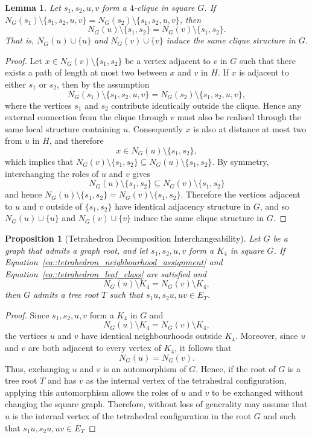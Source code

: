 \documentclass[11pt]{article}
\newtheorem{proposition}{Proposition}
\newtheorem{lemma}{Lemma}
\begin{document}
\begin{lemma} \label{lemma::tetrahedron_subset_neighbourhood}
  Let $s_1,s_2,u,v$ form a $4$-clique in square $G$. If $N_G(s_1)\setminus\{s_1,s_2,u,v\}=N_G(s_2)\setminus\{s_1,s_2,u,v\}$, then
  \[
  N_G(u)\setminus\{s_1, s_2\}=N_G(v)\setminus\{s_1, s_2\}.
  \]
  That is, $N_G(u)\cup\{u\}$ and $N_G(v)\cup\{v\}$ induce the same clique structure in $G$.
\end{lemma}
\begin{proof}
  Let $x \in N_G(v)\setminus\{s_1,s_2\}$ be a vertex adjacent to $v$ in $G$ such that there exists a path of length at most two between $x$ and $v$ in $H$. If $x$ is adjacent to either $s_1$ or $s_2$, then by the assumption
  \[
  N_G(s_1)\setminus\{s_1,s_2,u,v\}
  =
  N_G(s_2)\setminus\{s_1,s_2,u,v\},
  \]
  where the vertices $s_1$ and $s_2$ contribute identically outside the clique. Hence any external connection from the clique through $v$ must also be realised through the same local structure containing $u$. Consequently $x$ is also at distance at most two from $u$ in $H$, and therefore
  \[
  x\in N_G(u)\setminus\{s_1,s_2\},
  \]
  which implies that $N_G(v)\setminus\{s_1,s_2\} \subseteq N_G(u)\setminus\{s_1,s_2\}$. By symmetry, interchanging the roles of $u$ and $v$ gives
  \[
  N_G(u)\setminus\{s_1,s_2\} \subseteq N_G(v)\setminus\{s_1,s_2\} 
  \]
  and hence  $N_G(u)\setminus\{s_1,s_2\} = N_G(v)\setminus\{s_1,s_2\}$. Therefore the vertices adjacent to $u$ and $v$ outside of $\{s_1,s_2\}$ have identical adjacency structure in $G$, and so $N_G(u)\cup\{u\}$ and $N_G(v)\cup\{v\}$ induce the same clique structure in $G$.
\end{proof}

\begin{proposition}[Tetrahedron Decomposition Interchangeability] \label{prop::textrahedron_decomposition_equality}
  Let $G$ be a graph that admits a graph root, and let $s_1,s_2,u,v$ form a $K_4$ in square $G$. If Equation~\eqref{eq::tetrahedron_neighbourhood_assignment} and Equation~\eqref{eq::tetrahedron_leaf_class} are satisfied and
  \[
  N_G(u)\setminus K_4=N_G(v)\setminus K_4,
  \]
  then $G$ admits a tree root $T$ such that $s_1u,s_2u,uv \in E_T$. 
\end{proposition}
\begin{proof}
  Since $s_1,s_2,u,v$ form a $K_4$ in $G$ and
  \[
  N_G(u)\setminus K_4=N_G(v)\setminus K_4,
  \]
  the vertices $u$ and $v$ have identical neighbourhoods outside $K_4$. Moreover, since $u$ and $v$ are both adjacent to every vertex of $K_4$, it follows that
  \[
  N_G(u)=N_G(v).
  \]
  Thus, exchanging $u$ and $v$ is an automorphism of $G$. Hence, if the root of $G$ is a tree root $T$ and has $v$ as the internal vertex of the tetrahedral configuration, applying this automorphism allows the roles of $u$ and $v$ to be exchanged without changing the square graph. Therefore, without loss of generality may assume that $u$ is the internal vertex of the tetrahedral configuration in the root $G$ and such that $s_1u,s_2u,uv \in E_T$
\end{proof}
\end{document}
